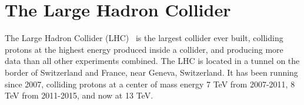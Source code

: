 



\section{The Large Hadron Collider}
The Large Hadron Collider (LHC)~\cite{lhcbrochure} is the largest collider ever built, colliding protons at the highest energy produced inside a collider, and producing more data than all other experiments combined. The LHC is located in a tunnel on the border of Switzerland and France, near Geneva, Switzerland. It has been running since 2007, colliding protons at a center of mass energy 7 TeV from 2007-2011, 8 TeV from 2011-2015, and now at 13 TeV. 

